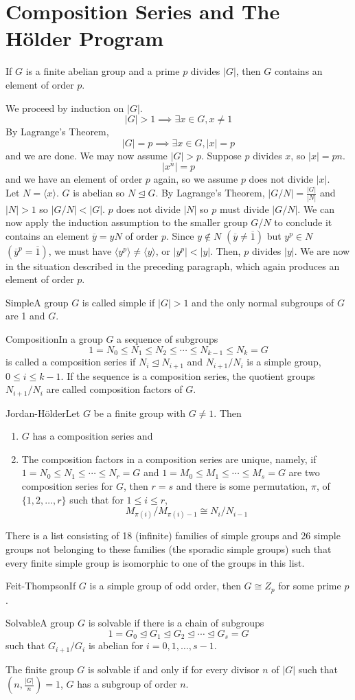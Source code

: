 \documentclass{report}
\newcommand{\thm}[2]{\begin{Theorem}{#1}{}#2\end{Theorem}}
\newcommand{\mprop}[2]{\begin{Prop}{#1}{}#2\end{Prop}}
\newcommand{\dfn}[2]{\begin{Definition}[colbacktitle=red!75!black]{#1}{}#2\end{Definition}}
\newenvironment{myproof}[1][\proofname]{%
	\proof[\bfseries #1: ]%
}{\endproof}
\begin{document}
\section{Composition Series and The H\"{o}lder Program}
\mprop{}{If $G$ is a finite abelian group and a prime $p$ divides $|G|$, then $G$ contains an element of order $p$. }
\begin{myproof}
    We proceed by induction on $|G|$. $$|G| > 1 \implies \exists x \in G, x \neq 1$$
    By Lagrange's Theorem, 
    $$|G| = p \implies \exists x\in G , |x| = p$$
    and we are done. We may now assume $|G| > p$. Suppose $p$ divides $x$, so $|x| = pn$. 
    $$|x^n | = p$$
    and we have an element of order $p$ again, so we assume $p$ does not divide $|x|$. \\
    Let $N = \langle x \rangle$. $G$ is abelian so $N \unlhd G$. By Lagrange's Theorem, $|G/N| = \frac{|G|}{|N|}$
    and $|N| > 1$ so $|G/N| < |G|$. $p$ does not divide $|N|$ so $p$ must divide $|G/N|$. We can now apply the induction assumption to the smaller group $G/N$ to conclude it contains an element $\overline y = yN$ of order $p$. Since $y \notin N$ $(\overline y \neq \overline 1)$ but $y^p \in N$ $(\overline y^p = \overline 1)$, we must have $\langle y^p \rangle \neq \langle y \rangle$, or $|y^p | < |y|$. Then, $p$ divides $|y|$. We are now in the situation described in the preceding paragraph, which again produces an element of order $p$. 
\end{myproof}
\dfn{Simple}{A group $G$ is called simple if $|G| > 1$ and the only normal subgroups of $G$ are 1 and $G$. }
\dfn{Composition}{In a group $G$ a sequence of subgroups
$$1 = N_0 \leq N_1 \leq N_2 \leq \cdots \leq N_{k-1} \leq N_k = G$$
is called a composition series if $N_i \unlhd N_{i+1}$ and $N_{i+1}/N_i$ is a simple group, $0 \leq i \leq k-1$. If the sequence is a composition series, the quotient groups $N_{i+1}/N_i$ are called composition factors of $G$. }
\thm{Jordan-H\"older}{Let $G$ be a finite group with $G \neq 1$. Then
\begin{enumerate}
    \item $G$ has a composition series and 
    \item The composition factors in a composition series are unique, namely, if $1 = N_0 \leq N_1 \leq \cdots \leq N_r = G$ and $1 = M_0 \leq M_1 \leq \cdots \leq M_s = G$ are two composition series for $G$, then $r=s$ and there is some permutation, $\pi$, of $\{1, 2, \dots , r\}$ such that for $1 \leq i \leq r$,  
    $$M_{\pi (i)}/M_{\pi (i)-1} \cong N_i / N_{i-1}$$
\end{enumerate}}
\thm{}{There is a list consisting of 18 (infinite) families of simple groups and 26 simple groups not belonging to these families (the sporadic simple groups) such that every finite simple group is isomorphic to one of the groups in this list. }
\thm{Feit-Thompson}{If $G$ is a simple group of odd order, then $G \cong Z_p$ for some prime $p$. }
\dfn{Solvable}{A group $G$ is solvable if there is a chain of subgroups
$$1 = G_0 \unlhd G_1 \unlhd G_2 \unlhd \cdots \unlhd G_s = G$$
such that $G_{i+1}/G_i$ is abelian for $i = 0, 1, \dots , s-1$. }
\thm{}{The finite group $G$ is solvable if and only if for every divisor $n$ of $|G|$ such that $(n, \frac{|G|}{n} ) = 1$, $G$ has a subgroup of order $n$. }
\end{document}
